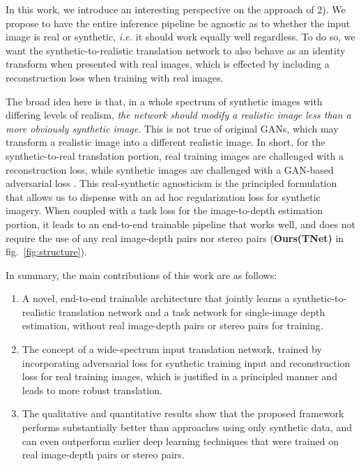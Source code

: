 \documentclass[runningheads]{llncs}
\def\ie{\emph{i.e.}\xspace}
\begin{document}
In this work, we introduce an interesting perspective on the approach of 2). We propose to have the entire inference pipeline be agnostic as to whether the input image is real or synthetic, \ie it should work equally well regardless. To do so, we want the synthetic-to-realistic translation network to also behave as an identity transform when presented with real images, which is effected by including a reconstruction loss when training with real images.

The broad idea here is that, in a whole spectrum of synthetic images with differing levels of realism, \emph{the network should modify a realistic image less than a more obviously synthetic image}. This is not true of original GANs, which may transform a realistic image into a different realistic image. In short, for the synthetic-to-real translation portion, real training images are challenged with a reconstruction loss, while synthetic images are challenged with a GAN-based adversarial loss \cite{goodfellow2014generative}. This real-synthetic agnosticism is the principled formulation that allows us to dispense with an ad hoc regularization loss for synthetic imagery. When coupled with a task loss for the image-to-depth estimation portion, it leads to an end-to-end trainable pipeline that works well, and does not require the use of any real image-depth pairs nor stereo pairs ({\bf Ours(TNet)} in fig.~\ref{fig:structure}).

In summary, the main contributions of this work are as follows:
\begin{enumerate}
	\item A novel, end-to-end trainable architecture that jointly learns a synthetic-to-realistic translation network and a task network for single-image depth estimation, without real image-depth pairs or stereo pairs for training. 
	
	\item The concept of a wide-spectrum input translation network, trained by incorporating adversarial loss for synthetic training input and reconstruction loss for real training images, which is justified in a principled manner and leads to more robust translation.
	
	\item The qualitative and quantitative results show that the proposed framework performs substantially better than approaches using only synthetic data, and can even outperform earlier deep learning techniques that were trained on real image-depth pairs or stereo pairs.
\end{enumerate}
\end{document}
